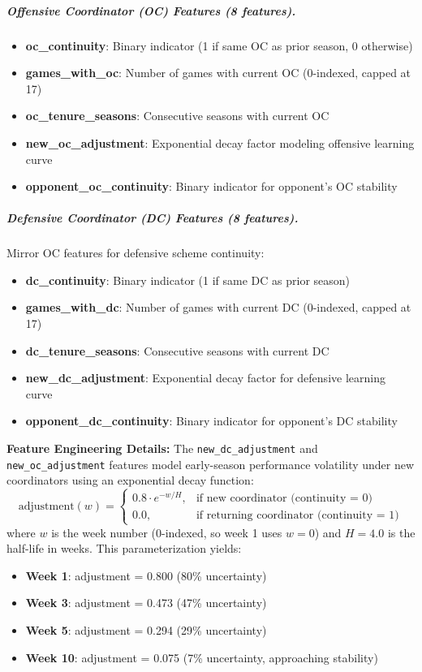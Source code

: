 \subparagraph{Offensive Coordinator (OC) Features (8 features).}
\begin{itemize}
  \item \textbf{oc\_continuity}: Binary indicator (1 if same OC as prior season, 0 otherwise)
  \item \textbf{games\_with\_oc}: Number of games with current OC (0-indexed, capped at 17)
  \item \textbf{oc\_tenure\_seasons}: Consecutive seasons with current OC
  \item \textbf{new\_oc\_adjustment}: Exponential decay factor modeling offensive learning curve
  \item \textbf{opponent\_oc\_continuity}: Binary indicator for opponent's OC stability
\end{itemize}

\subparagraph{Defensive Coordinator (DC) Features (8 features).}
Mirror OC features for defensive scheme continuity:
\begin{itemize}
  \item \textbf{dc\_continuity}: Binary indicator (1 if same DC as prior season)
  \item \textbf{games\_with\_dc}: Number of games with current DC (0-indexed, capped at 17)
  \item \textbf{dc\_tenure\_seasons}: Consecutive seasons with current DC
  \item \textbf{new\_dc\_adjustment}: Exponential decay factor for defensive learning curve
  \item \textbf{opponent\_dc\_continuity}: Binary indicator for opponent's DC stability
\end{itemize}

\noindent\textbf{Feature Engineering Details:}
The \texttt{new\_dc\_adjustment} and \texttt{new\_oc\_adjustment} features model early-season performance volatility under new coordinators using an exponential decay function:
\begin{equation}
\text{adjustment}(w) = \begin{cases}
0.8 \cdot e^{-w / H}, & \text{if new coordinator (continuity = 0)} \\
0.0, & \text{if returning coordinator (continuity = 1)}
\end{cases}
\label{eq:coordinator_adjustment}
\end{equation}
where $w$ is the week number (0-indexed, so week 1 uses $w=0$) and $H=4.0$ is the half-life in weeks. This parameterization yields:
\begin{itemize}
  \item \textbf{Week 1}: adjustment = 0.800 (80\% uncertainty)
  \item \textbf{Week 3}: adjustment = 0.473 (47\% uncertainty)
  \item \textbf{Week 5}: adjustment = 0.294 (29\% uncertainty)
  \item \textbf{Week 10}: adjustment = 0.075 (7\% uncertainty, approaching stability)
\end{itemize}

